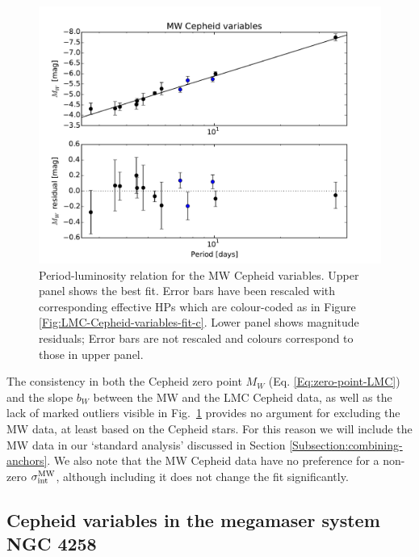 \begin{figure}[tbp]
\centering %
\includegraphics[scale=0.75]{figures/chapter-h0/effective_HP_cepheids_MW.pdf} 
\caption{Period-luminosity relation for the MW Cepheid variables. Upper panel shows the best fit. Error bars have been rescaled with corresponding effective HPs which are colour-coded as in Figure \ref{Fig:LMC-Cepheid-variables-fit-c}. Lower panel shows magnitude residuals; Error bars are not rescaled and colours correspond to those in upper panel.}
\label{Fig:MW-Cepheid-variables}
\end{figure}

The consistency in both the Cepheid zero point $M_W$ (Eq. \eqref{Eq:zero-point-LMC}) and the slope $b_W$ between the MW and the LMC Cepheid data, as well as the lack of marked outliers visible in Fig.\ \ref{Fig:MW-Cepheid-variables} provides no argument for excluding the MW data, at least based on the Cepheid stars. For this reason we will include the MW data in our `standard analysis' discussed in Section \ref{Subsection:combining-anchors}. We also note that the MW Cepheid data have no preference for a non-zero $\sigma^{\mathrm{MW}}_{\mathrm{int}}$, although including it does not change the fit significantly.

\subsection{Cepheid variables in the megamaser system NGC 4258}
\label{Subsection:NGC4258}

